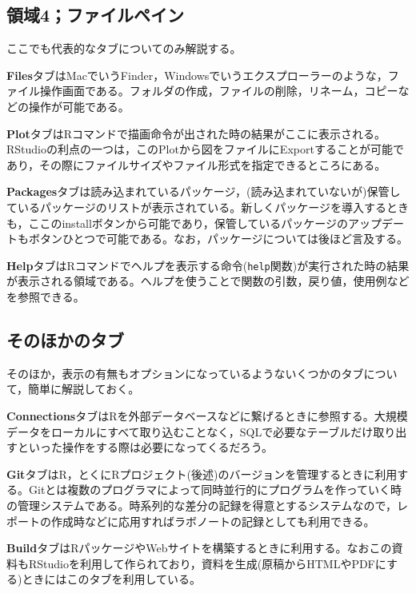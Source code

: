 \documentclass[
  a4paper,
]{ltjsbook}
\begin{document}
\hypertarget{ux9818ux57df4ux30d5ux30a1ux30a4ux30ebux30daux30a4ux30f3}{%
\subsection{領域4；ファイルペイン}\label{ux9818ux57df4ux30d5ux30a1ux30a4ux30ebux30daux30a4ux30f3}}

ここでも代表的なタブについてのみ解説する。

\textbf{Files}タブはMacでいうFinder，Windowsでいうエクスプローラーのような，ファイル操作画面である。フォルダの作成，ファイルの削除，リネーム，コピーなどの操作が可能である。

\textbf{Plot}タブはRコマンドで描画命令が出された時の結果がここに表示される。RStudioの利点の一つは，このPlotから図をファイルにExportすることが可能であり，その際にファイルサイズやファイル形式を指定できるところにある。

\textbf{Packages}タブは読み込まれているパッケージ，(読み込まれていないが)保管しているパッケージのリストが表示されている。新しくパッケージを導入するときも，ここのinstallボタンから可能であり，保管しているパッケージのアップデートもボタンひとつで可能である。なお，パッケージについては後ほど言及する。

\textbf{Help}タブはRコマンドでヘルプを表示する命令(\texttt{help}関数)が実行された時の結果が表示される領域である。ヘルプを使うことで関数の引数，戻り値，使用例などを参照できる。

\hypertarget{ux305dux306eux307bux304bux306eux30bfux30d6}{%
\subsection{そのほかのタブ}\label{ux305dux306eux307bux304bux306eux30bfux30d6}}

そのほか，表示の有無もオプションになっているようないくつかのタブについて，簡単に解説しておく。

\textbf{Connections}タブはRを外部データベースなどに繋げるときに参照する。大規模データをローカルにすべて取り込むことなく，SQLで必要なテーブルだけ取り出すといった操作をする際は必要になってくるだろう。

\textbf{Git}タブはR，とくにRプロジェクト(後述)のバージョンを管理するときに利用する。Gitとは複数のプログラマによって同時並行的にプログラムを作っていく時の管理システムである。時系列的な差分の記録を得意とするシステムなので，レポートの作成時などに応用すればラボノートの記録としても利用できる。

\textbf{Build}タブはRパッケージやWebサイトを構築するときに利用する。なおこの資料もRStudioを利用して作られており，資料を生成(原稿からHTMLやPDFにする)ときにはこのタブを利用している。
\end{document}
